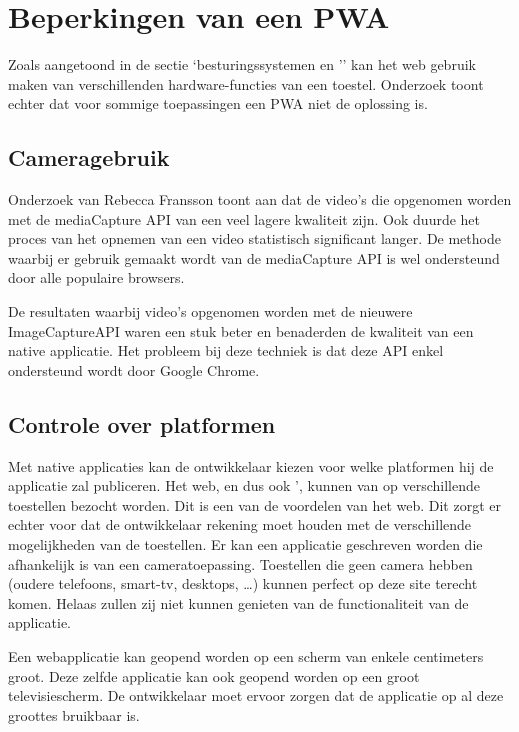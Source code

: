 \section{Beperkingen van een PWA}
\label{ch: beperkingenPWA}

Zoals aangetoond in de sectie ‘besturingssystemen en '’ kan het web gebruik maken van verschillenden hardware-functies van een toestel. Onderzoek toont echter dat voor sommige toepassingen een PWA niet de oplossing is.
\autocite{Malavolta2016}


\subsection{Cameragebruik}
	Onderzoek van Rebecca Fransson toont aan dat de video’s die opgenomen worden met de mediaCapture API van een veel lagere kwaliteit zijn. Ook duurde het proces van het opnemen van een video statistisch significant langer. De methode waarbij er gebruik gemaakt wordt van de mediaCapture API is wel ondersteund door alle populaire browsers.
	
	De resultaten waarbij video’s opgenomen worden met de nieuwere ImageCaptureAPI waren een stuk beter en benaderden de kwaliteit van een native applicatie. Het probleem bij deze techniek is dat deze API enkel ondersteund wordt door Google Chrome.
	\autocite{Fransson2017}
	

\subsection{Controle over platformen}
	
	Met native applicaties kan de ontwikkelaar kiezen voor welke platformen hij de applicatie zal publiceren. Het web, en dus ook ', kunnen van op verschillende toestellen bezocht worden. Dit is een van de voordelen van het web. Dit zorgt er echter voor dat de ontwikkelaar rekening moet houden met de verschillende mogelijkheden van de toestellen. Er kan een applicatie geschreven worden die afhankelijk is van een cameratoepassing. Toestellen die geen camera hebben (oudere telefoons, smart-tv, desktops, …) kunnen perfect op deze site terecht komen. Helaas zullen zij niet kunnen genieten van de functionaliteit van de applicatie.
	
	Een webapplicatie kan geopend worden op een scherm van enkele centimeters groot. Deze zelfde applicatie kan ook geopend worden op een groot televisiescherm. De ontwikkelaar moet ervoor zorgen dat de applicatie op al deze groottes bruikbaar is.
	
